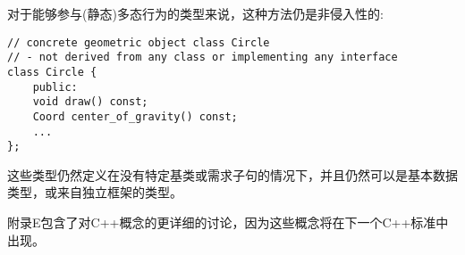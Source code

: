 对于能够参与(静态)多态行为的类型来说，这种方法仍是非侵入性的:

\begin{lstlisting}[style=styleCXX]
// concrete geometric object class Circle
// - not derived from any class or implementing any interface
class Circle {
	public:
	void draw() const;
	Coord center_of_gravity() const;
	...
};
\end{lstlisting}

这些类型仍然定义在没有特定基类或需求子句的情况下，并且仍然可以是基本数据类型，或来自独立框架的类型。

附录E包含了对C++概念的更详细的讨论，因为这些概念将在下一个C++标准中出现。



















